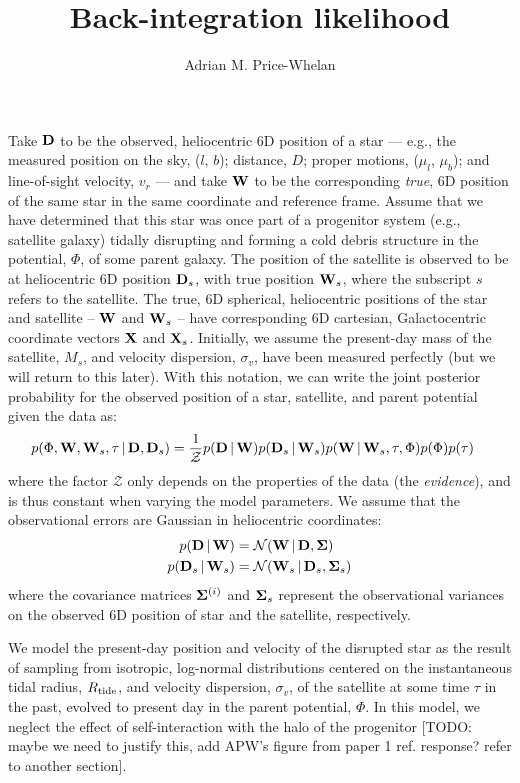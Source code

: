 \documentclass[letterpaper,12pt,preprint]{aastex}
\newcommand{\given}{\,|\,}
\newcommand{\D}{{\bf D}}
\newcommand{\W}{{\bf W}}
\newcommand{\X}{{\bf X}}
\newcommand{\bSigma}{{\bf \Sigma}}
\begin{document}
\title{Back-integration likelihood}
\author{Adrian M. Price-Whelan}

Take $\D$ to be the observed, heliocentric 6D position of a star --- e.g., the measured position on the sky, ($l$, $b$); distance, $D$; proper motions, ($\mu_l$, $\mu_b$); and line-of-sight velocity, $v_r$ --- and take $\W$ to be the corresponding \emph{true}, 6D position of the same star in the same coordinate and reference frame. Assume that we have determined that this star was once part of a progenitor system (e.g., satellite galaxy) tidally disrupting and forming a cold debris structure in the potential, $\Phi$, of some parent galaxy. The position of the satellite is observed to be at heliocentric 6D position $\D_s$, with true position $\W_s$, where the subscript $s$ refers to the satellite. The true, 6D spherical, heliocentric positions of the star and satellite -- $\W$ and $\W_s$ -- have corresponding 6D cartesian, Galactocentric coordinate vectors $\X$ and $\X_s$. Initially, we assume the present-day mass of the satellite, $M_s$, and velocity dispersion, $\sigma_v$, have been measured perfectly (but we will return to this later). With this notation, we can write the joint posterior probability for the observed position of a star, satellite, and parent potential given the data as:
\begin{align}
	p(\Phi, \W, \W_s, \tau \given \D, \D_s) &= \frac{1}{\mathcal{Z}} p(\D \given \W) p(\D_s \given \W_s) 
												       p(\W \given \W_s, \tau, \Phi) 
												       p(\Phi) p(\tau)
\end{align}
where the factor $\mathcal{Z}$ only depends on the properties of the data (the \emph{evidence}), and is thus constant when varying the model parameters. We assume that the observational errors are Gaussian in heliocentric coordinates:
\begin{align}
	p(\D \given \W) &= \mathcal{N}(\W \given \D, \bSigma)\\
	p(\D_s \given \W_s) &= \mathcal{N}(\W_s \given \D_s, \bSigma_s)
\end{align}
where the covariance matrices $\bSigma^{(i)}$ and $\bSigma_s$ represent the observational variances on the observed 6D position of star and the satellite, respectively. 

We model the present-day position and velocity of the disrupted star as the result of sampling from isotropic, log-normal distributions centered on the instantaneous tidal radius, $R_{\rm tide}$, and velocity dispersion, $\sigma_v$, of the satellite at some time $\tau$ in the past, evolved to present day in the parent potential, $\Phi$. In this model, we neglect the effect of self-interaction with the halo of the progenitor [TODO: maybe we need to justify this, add APW's figure from paper 1 ref. response? refer to another section]. 
\end{document}
